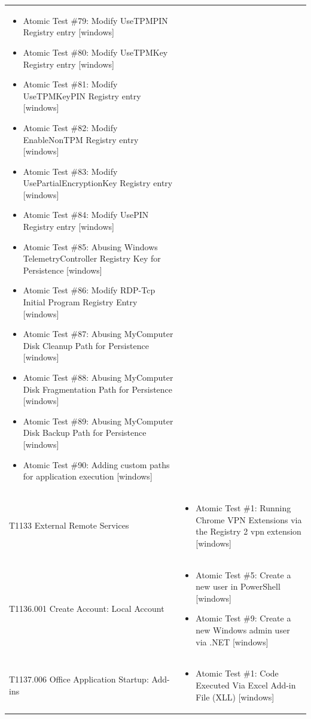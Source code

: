 \begin{longtable}{p{} p{}}
\begin{itemize}[leftmargin=*, nosep, topsep=0pt]
  \item Atomic Test \#79: Modify UseTPMPIN Registry entry [windows]
  \item Atomic Test \#80: Modify UseTPMKey Registry entry [windows]
  \item Atomic Test \#81: Modify UseTPMKeyPIN Registry entry [windows]
  \item Atomic Test \#82: Modify EnableNonTPM Registry entry [windows]
  \item Atomic Test \#83: Modify UsePartialEncryptionKey Registry entry [windows]
  \item Atomic Test \#84: Modify UsePIN Registry entry [windows]
  \item Atomic Test \#85: Abusing Windows TelemetryController Registry Key for Persistence [windows]
  \item Atomic Test \#86: Modify RDP-Tcp Initial Program Registry Entry [windows]
  \item Atomic Test \#87: Abusing MyComputer Disk Cleanup Path for Persistence [windows]
  \item Atomic Test \#88: Abusing MyComputer Disk Fragmentation Path for Persistence [windows]
  \item Atomic Test \#89: Abusing MyComputer Disk Backup Path for Persistence [windows]
  \item Atomic Test \#90: Adding custom paths for application execution [windows]
\end{itemize} \\ [1.5ex]
T1133 External Remote Services & \begin{itemize}[leftmargin=*, nosep, topsep=0pt]
  \item Atomic Test \#1: Running Chrome VPN Extensions via the Registry 2 vpn extension [windows]
\end{itemize} \\ [1.5ex]
T1136.001 Create Account: Local Account & \begin{itemize}[leftmargin=*, nosep, topsep=0pt]
  \item Atomic Test \#5: Create a new user in PowerShell [windows]
  \item Atomic Test \#9: Create a new Windows admin user via .NET [windows]
\end{itemize} \\ [1.5ex]
T1137.006 Office Application Startup: Add-ins & \begin{itemize}[leftmargin=*, nosep, topsep=0pt]
  \item Atomic Test \#1: Code Executed Via Excel Add-in File (XLL) [windows]

\end{itemize}
\end{longtable}
